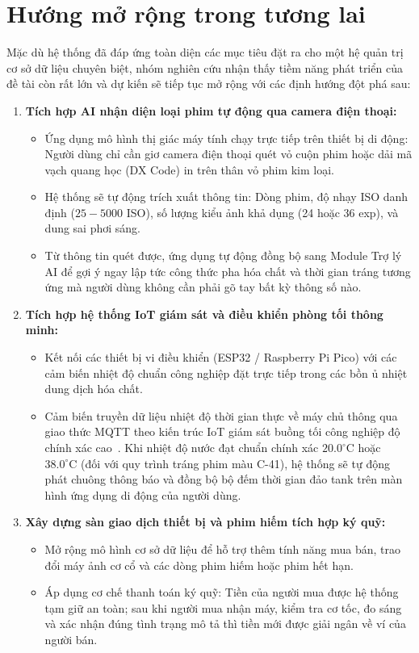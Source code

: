 \section{Hướng mở rộng trong tương lai}

Mặc dù hệ thống đã đáp ứng toàn diện các mục tiêu đặt ra cho một hệ quản trị cơ sở dữ liệu chuyên biệt, nhóm nghiên cứu nhận thấy tiềm năng phát triển của đề tài còn rất lớn và dự kiến sẽ tiếp tục mở rộng với các định hướng đột phá sau:

\begin{enumerate}[leftmargin=2em]
    \item \textbf{Tích hợp AI nhận diện loại phim tự động qua camera điện thoại:}
    \begin{itemize}
        \item Ứng dụng mô hình thị giác máy tính chạy trực tiếp trên thiết bị di động: Người dùng chỉ cần giơ camera điện thoại quét vỏ cuộn phim hoặc dải mã vạch quang học (DX Code) in trên thân vỏ phim kim loại.
        \item Hệ thống sẽ tự động trích xuất thông tin: Dòng phim, độ nhạy ISO danh định ($25 - 5000$ ISO), số lượng kiểu ảnh khả dụng (24 hoặc 36 exp), và dung sai phơi sáng.
        \item Từ thông tin quét được, ứng dụng tự động đồng bộ sang Module Trợ lý AI để gợi ý ngay lập tức công thức pha hóa chất và thời gian tráng tương ứng mà người dùng không cần phải gõ tay bất kỳ thông số nào.
    \end{itemize}

    \item \textbf{Tích hợp hệ thống IoT giám sát và điều khiển phòng tối thông minh:}
    \begin{itemize}
        \item Kết nối các thiết bị vi điều khiển (ESP32 / Raspberry Pi Pico) với các cảm biến nhiệt độ chuẩn công nghiệp đặt trực tiếp trong các bồn ủ nhiệt dung dịch hóa chất.
        \item Cảm biến truyền dữ liệu nhiệt độ thời gian thực về máy chủ thông qua giao thức MQTT theo kiến trúc IoT giám sát buồng tối công nghiệp độ chính xác cao~\cite{kumar2024iot}. Khi nhiệt độ nước đạt chuẩn chính xác $20.0^\circ\text{C}$ hoặc $38.0^\circ\text{C}$ (đối với quy trình tráng phim màu C-41), hệ thống sẽ tự động phát chuông thông báo và đồng bộ bộ đếm thời gian đảo tank trên màn hình ứng dụng di động của người dùng.
    \end{itemize}

    \item \textbf{Xây dựng sàn giao dịch thiết bị và phim hiếm tích hợp ký quỹ:}
    \begin{itemize}
        \item Mở rộng mô hình cơ sở dữ liệu để hỗ trợ thêm tính năng mua bán, trao đổi máy ảnh cơ cổ và các dòng phim hiếm hoặc phim hết hạn.
        \item Áp dụng cơ chế thanh toán ký quỹ: Tiền của người mua được hệ thống tạm giữ an toàn; sau khi người mua nhận máy, kiểm tra cơ tốc, đo sáng và xác nhận đúng tình trạng mô tả thì tiền mới được giải ngân về ví của người bán.
    \end{itemize}


\end{enumerate}

